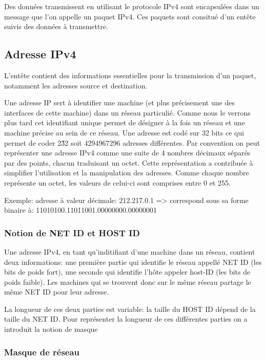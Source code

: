 Des données transmissent en utilisant le protocole IPv4 sont encapsulées dans un message que
l'on appelle un paquet IPv4. Ces paquets sont consitué d'un entête suivis des données à transmettre.

\subsection{Adresse IPv4}

L'entête contient des informations essentielles pour la transmission d'un paquet, notamment les
adresses source et destination.

Une adresse IP sert à identifier une machine (et plus précisement une des interfaces de cette machine)
dans un réseau particulié.
Comme nous le verrons plus tard cet identifiant unique permet de désigner à la fois un
réseau et une machine précise au sein de ce réseau.
Une adresse est codé sur 32 bits ce qui permet de coder 2\^32 soit 4294967296 adresses différentes.
Par convention on peut représenter une adresse IPv4 comme une suite de 4 nombres décimaux séparés par des points,
chacun traduisant un octet. Cette représentation a contribuée à simplifier l'utilisation et la manipulation
des adresses.
Comme chaque nombre représente un octet, les valeurs de celui-ci sont comprises entre 0 et 255.

\vspace{1cm}
Exemple: adresse à valeur décimale: 212.217.0.1 => correspond sous sa forme
binaire à: 11010100.11011001.00000000.00000001
\vspace{1cm}

\subsubsection{Notion de NET ID et HOST ID}
Une adresse IPv4, en tant qu'inditifiant d'une machine dans un réseau, contient deux informations:
une première partie qui identifie le réseau appellé NET ID (les bits de poids fort), une seconde qui identifie l’hôte appeler host-ID (les bits de poids faible).
Les machines qui se trouvent donc sur le même réseau partage le même NET ID pour leur adresse.

La longueur de ces deux parties est variable: la taille du HOST ID dépend de la taille du NET ID. Pour représenter la longueur de ces différentes parties on a introduit la notion de masque

\subsubsection{Masque de réseau}

